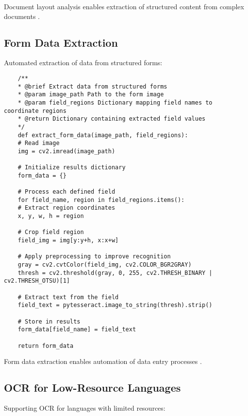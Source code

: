Document layout analysis enables extraction of structured content from complex documents \cite{Anitha:2024}.

\subsection{Form Data Extraction}
\label{subsec:form_extraction}

Automated extraction of data from structured forms:

\begin{verbatim}
	/**
	* @brief Extract data from structured forms
	* @param image_path Path to the form image
	* @param field_regions Dictionary mapping field names to coordinate regions
	* @return Dictionary containing extracted field values
	*/
	def extract_form_data(image_path, field_regions):
	# Read image
	img = cv2.imread(image_path)
	
	# Initialize results dictionary
	form_data = {}
	
	# Process each defined field
	for field_name, region in field_regions.items():
	# Extract region coordinates
	x, y, w, h = region
	
	# Crop field region
	field_img = img[y:y+h, x:x+w]
	
	# Apply preprocessing to improve recognition
	gray = cv2.cvtColor(field_img, cv2.COLOR_BGR2GRAY)
	thresh = cv2.threshold(gray, 0, 255, cv2.THRESH_BINARY | cv2.THRESH_OTSU)[1]
	
	# Extract text from the field
	field_text = pytesseract.image_to_string(thresh).strip()
	
	# Store in results
	form_data[field_name] = field_text
	
	return form_data
\end{verbatim}

Form data extraction enables automation of data entry processes \cite{DataCamp:2024}.

\subsection{OCR for Low-Resource Languages}
\label{subsec:low_resource}

Supporting OCR for languages with limited resources:

